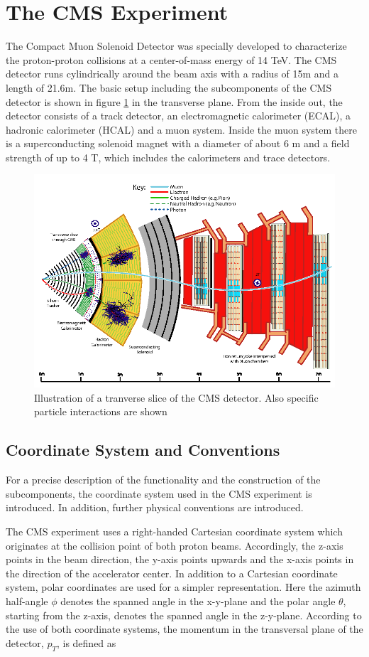\documentclass[12pt, a4paper]{thesis}
\begin{document}
\section{The CMS Experiment}
\label{sec:orge5edd5f}
The Compact Muon Solenoid Detector was specially developed to
characterize the proton-proton collisions at a center-of-mass energy
of 14 TeV. The CMS detector runs cylindrically around the beam axis
with a radius of 15m and a length of 21.6m. The basic setup including
the subcomponents of the CMS detector is shown in figure
\ref{cms-detector} in the transverse plane.  From the inside out, the
detector consists of a track detector, an electromagnetic calorimeter
(ECAL), a hadronic calorimeter (HCAL) and a muon system.  Inside the
muon system there is a superconducting solenoid magnet with a diameter
of about 6 m and a field strength of up to 4 T, which includes the
calorimeters and trace detectors.
\begin{figure}[H]
  \centering
  \includegraphics[width=0.8 \textwidth]{../images/cms_detector.png}
  \caption{Illustration of a tranverse slice of the CMS detector. Also specific particle interactions are shown \cite{sirunyan17}}
  \label{cms-detector}
\end{figure}

\subsection{Coordinate System and Conventions} %
\label{sec:org067f254}

For a precise description of the functionality and the construction of
the subcomponents, the coordinate system used in the CMS experiment is
introduced. In addition, further physical conventions are introduced.

The CMS experiment uses a right-handed Cartesian coordinate system which
originates at the collision point of both proton beams. Accordingly, the z-axis
points in the beam direction, the y-axis points upwards and the x-axis points in
the direction of the accelerator center. In addition to a Cartesian coordinate
system, polar coordinates are used for a simpler representation. Here the
azimuth half-angle \(\phi\) denotes the spanned angle in the x-y-plane and the polar
angle \(\theta\), starting from the z-axis, denotes the spanned angle in the
z-y-plane.
According to the use of both coordinate systems, the momentum in the transversal
plane of the detector, \(p_T\), is defined as
\end{document}
